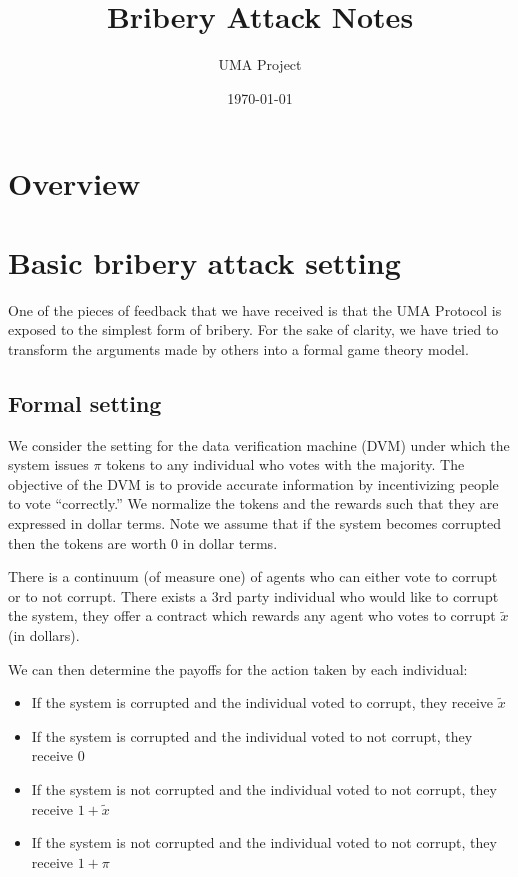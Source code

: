 \documentclass[12pt]{article}
\title{Bribery Attack Notes}
\author{UMA Project}
\date{\today}
\begin{document}
\maketitle
\clearpage
\newpage

\section{Overview}

\section{Basic bribery attack setting}

  One of the pieces of feedback that we have received is that the UMA Protocol is exposed to the
  simplest form of bribery. For the sake of clarity, we have tried to transform the arguments made
  by others into a formal game theory model.

  \subsection{Formal setting} \label{bba_fs}

    We consider the setting for the data verification machine (DVM) under which the system issues
    $\pi$ tokens to any individual who votes with the majority. The objective of the DVM is to
    provide accurate information by incentivizing people to vote ``correctly.'' We normalize the
    tokens and the rewards such that they are expressed in dollar terms. Note we assume that if the
    system becomes corrupted then the tokens are worth 0 in dollar terms.

    There is a continuum (of measure one) of agents who can either vote to corrupt or to not
    corrupt. There exists a 3rd party individual who would like to corrupt the system, they offer
    a contract which rewards any agent who votes to corrupt $\tilde{x}$ (in dollars).

    We can then determine the payoffs for the action taken by each individual:

    \begin{itemize}
      \item If the system is corrupted and the individual voted to corrupt, they receive
        $\tilde{x}$
      \item If the system is corrupted and the individual voted to not corrupt, they receive $0$
      \item If the system is not corrupted and the individual voted to not corrupt, they receive
        $1 + \tilde{x}$
      \item If the system is not corrupted and the individual voted to not corrupt, they receive
        $1 + \pi$
    \end{itemize}
\end{document}
